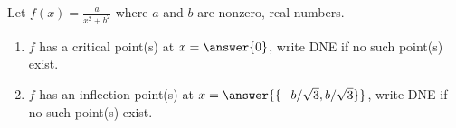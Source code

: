 \documentclass{ximera}
\author{Gregory Hartman \and Matthew Carr}
\begin{document}
\begin{exercise}



Let $f(x)=\frac{a}{x^2+b^2}$  where $a$ and $b$ are nonzero, real numbers. 
\begin{enumerate}
\item		$f$ has a critical point(s) at $x = \answer{0}$, write DNE if no such point(s) exist.
\item		$f$ has an inflection point(s) at $x = \answer{\{-b/\sqrt{3},b/\sqrt{3}\}}$, write DNE if no such point(s) exist.

\end{enumerate}

\end{exercise}
\end{document}
